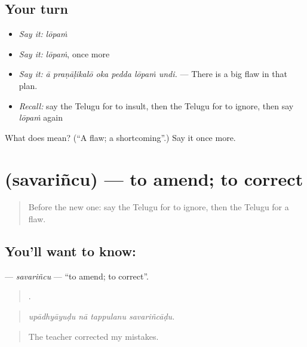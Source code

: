 \subsection*{Your turn}
\begin{itemize}
\raggedright
  \item \emph{Say it:} \emph{lōpaṁ}
  \item \emph{Say it:} \emph{lōpaṁ}, once more
  \item \emph{Say it:} \emph{ā praṇāḷikalō oka pedda lōpaṁ undi.} — There is a big flaw in that plan.
  \item \emph{Recall:} say the Telugu for to insult, then the Telugu for to ignore, then say \emph{lōpaṁ} again
\end{itemize}

\begin{tcolorbox}[breakable,colback=teal!4,colframe=teal!35!black,title={Before you move on}]
What does  mean? (\textquotedblleft{}A flaw; a shortcoming\textquotedblright{}.) Say it once more.
\end{tcolorbox}
\section[\texorpdfstring{\te{సవరించు} (savariñcu)}{సవరించు (savariñcu)}]{ (savariñcu) — to amend; to correct}

\label{lesson:TE-C428-savarincu}



\begin{quote}
Before the new one: say the Telugu for to ignore, then the Telugu for a flaw.
\end{quote}

\subsection*{You'll want to know: }
\textbf{} — \emph{savariñcu} — \textquotedblleft{}to amend; to correct\textquotedblright{}.

\begin{quote}
   .
\end{quote}

\begin{quote}
\emph{upādhyāyuḍu nā tappulanu savariñcāḍu.}
\end{quote}

\begin{quote}
The teacher corrected my mistakes.
\end{quote}

